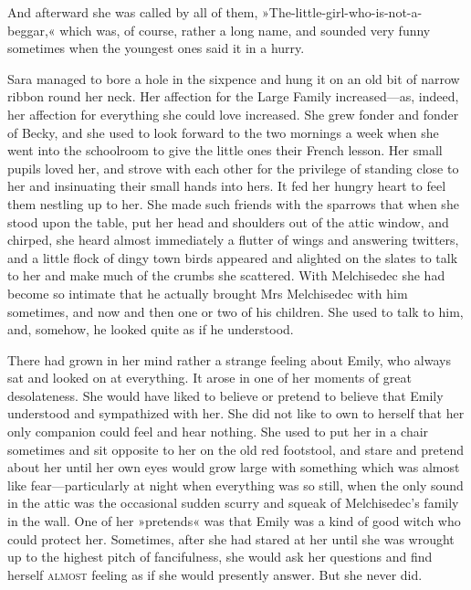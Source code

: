 And afterward she was called by all of them, »The-little-girl-who-is-not-a-beggar,« which was, of course, rather a long name, and sounded very funny sometimes when the youngest ones said it in a hurry.

Sara managed to bore a hole in the sixpence and hung it on an old bit of narrow ribbon round her neck. Her affection for the Large Family increased—as, indeed, her affection for everything she could love increased. She grew fonder and fonder of Becky, and she used to look forward to the two mornings a week when she went into the schoolroom to give the little ones their French lesson. Her small pupils loved her, and strove with each other for the privilege of standing close to her and insinuating their small hands into hers. It fed her hungry heart to feel them nestling up to her. She made such friends with the sparrows that when she stood upon the table, put her head and shoulders out of the attic window, and chirped, she heard almost immediately a flutter of wings and answering twitters, and a little flock of dingy town birds appeared and alighted on the slates to talk to her and make much of the crumbs she scattered. With Melchisedec she had become so intimate that he actually brought Mrs Melchisedec with him sometimes, and now and then one or two of his children. She used to talk to him, and, somehow, he looked quite as if he understood.

There had grown in her mind rather a strange feeling about Emily, who always sat and looked on at everything. It arose in one of her moments of great desolateness. She would have liked to believe or pretend to believe that Emily understood and sympathized with her. She did not like to own to herself that her only companion could feel and hear nothing. She used to put her in a chair sometimes and sit opposite to her on the old red footstool, and stare and pretend about her until her own eyes would grow large with something which was almost like fear—particularly at night when everything was so still, when the only sound in the attic was the occasional sudden scurry and squeak of Melchisedec's family in the wall. One of her »pretends« was that Emily was a kind of good witch who could protect her. Sometimes, after she had stared at her until she was wrought up to the highest pitch of fancifulness, she would ask her questions and find herself \textsc{almost} feeling as if she would presently answer. But she never did.

